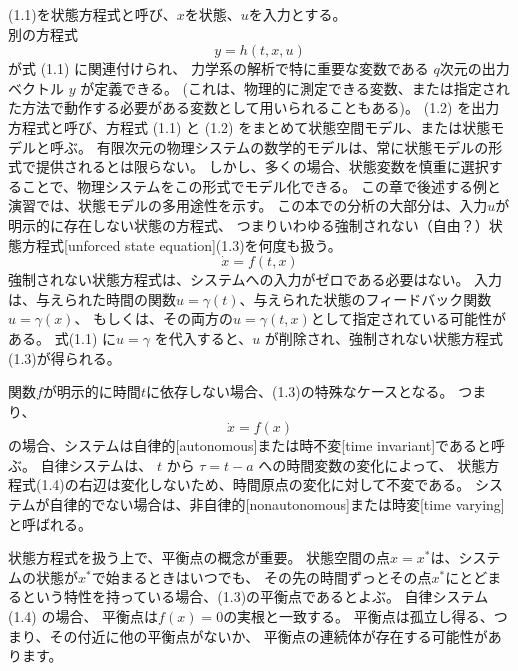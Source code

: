 \documentclass{jsarticle}
\begin{document}
    (1.1)を状態方程式と呼び、$x$を状態、$u$を入力とする。\\
    別の方程式 
    \begin{equation}
        y = h(t,x,u) \tag{1.2}
    \end{equation}
    が式 (1.1) に関連付けられ、
    力学系の解析で特に重要な変数である 
    $q$次元の出力ベクトル $y$ が定義できる。
    (これは、物理的に測定できる変数、または指定された方法で動作する必要がある変数として用いられることもある)。 
    (1.2) を出力方程式と呼び、方程式 (1.1) と (1.2) をまとめて状態空間モデル、または状態モデルと呼ぶ。 
    有限次元の物理システムの数学的モデルは、常に状態モデルの形式で提供されるとは限らない。 
    しかし、多くの場合、状態変数を慎重に選択することで、物理システムをこの形式でモデル化できる。 
    この章で後述する例と演習では、状態モデルの多用途性を示す。
    \newpage
    この本での分析の大部分は、入力$u$が明示的に存在しない状態の方程式、
    つまりいわゆる強制されない（自由？）状態方程式[unforced state equation](1.3)を何度も扱う。
    \begin{equation}
        \dot x = f(t,x) \tag{1.3}
    \end{equation}
    強制されない状態方程式は、システムへの入力がゼロである必要はない。 
    入力は、与えられた時間の関数$u= \gamma(t)$、与えられた状態のフィードバック関数$u= \gamma(x)$、
    もしくは、その両方の$u = \gamma ( t , x )$として指定されている可能性がある。
    式(1.1) に$u = \gamma$ を代入すると、$u$ が削除され、強制されない状態方程式(1.3)が得られる。
    
    関数$f$が明示的に時間$t$に依存しない場合、(1.3)の特殊なケースとなる。 
    つまり、
    \begin{equation}
        \dot x = f(x) \tag{1.4}
    \end{equation}
    の場合、システムは自律的[autonomous]または時不変[time invariant]であると呼ぶ。 
    自律システムは、
    $t$ から $\tau = t -a$ への時間変数の変化によって、
    状態方程式(1.4)の右辺は変化しないため、時間原点の変化に対して不変である。
    システムが自律的でない場合は、非自律的[nonautonomous]または時変[time varying]と呼ばれる。 
    
    状態方程式を扱う上で、平衡点の概念が重要。 
    状態空間の点$x = x^*$は、システムの状態が$x^*$で始まるときはいつでも、
    その先の時間ずっとその点$x^*$にとどまるという特性を持っている場合、(1.3)の平衡点であるとよぶ。 
    自律システム (1.4) の場合、
    平衡点は$f(x)=0$の実根と一致する。
    平衡点は孤立し得る、つまり、その付近に他の平衡点がないか、
    平衡点の連続体が存在する可能性があります。
\end{document}
